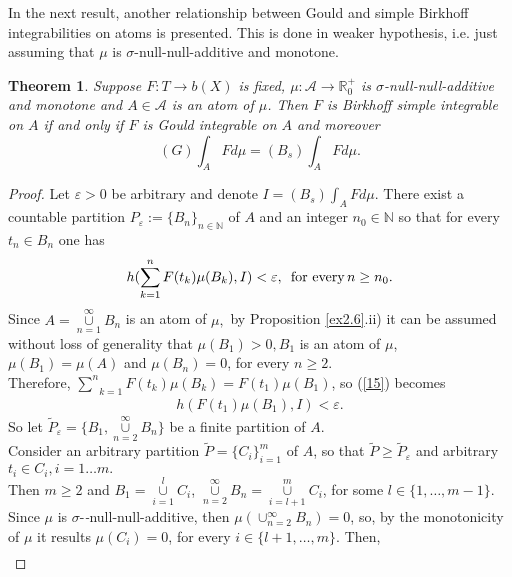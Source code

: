 \documentclass[11pt,a4paper,twoside]{amsart}
\newtheorem{theorem}{Theorem}[section]
\begin{document}
In the next result, another relationship between Gould and simple Birkhoff 
integrabilities on atoms is presented. This is done in weaker hypothesis, i.e. just assuming 
that $\mu $ is $\sigma$-null-null-additive and monotone.
\begin{theorem}\label{ex4.3}
Suppose $F:T\rightarrow b(X)$  is fixed,
$\mu :\mathcal{A}\rightarrow \mathbb{R}^{+}_0$
is $\sigma$-null-null-additive and monotone and $A\in \mathcal{A}$
 is an atom of $\mu $. Then  $F$ is Birkhoff simple
integrable on $A$ if and only if  $F$ is Gould integrable on $A$
 and moreover
$$(G)\int_{A}Fd\mu =(B_s)\int_{A}Fd\mu .$$
\end{theorem}
\begin{proof} Let $\varepsilon >0$ be arbitrary and denote 
$I=(B_s)\int_{A}Fd\mu .$ There exist a countable partition $P_{\varepsilon}:=\{B_{n}\}_{n\in \mathbb{N}}$ of $A$ and 
an integer $n_0\in\mathbb{N}$ 
so that for every $t_{n}\in B_{n}$ 
one has
\begin{eqnarray}\label{15}
h(\sum_{k=1}^n F(t_{k})\mu (B_{k}),I)<\varepsilon , \mbox{\, for every\,} n\geq n_0.
\end{eqnarray}
Since $A=\underset{n=1}{\overset{\infty }{\cup }}B_{n}$ is an atom of $\mu ,$
by Proposition \ref{ex2.6}.ii) it can be assumed
without  loss of generality that 
$\mu (B_{1})>0,B_{1}$ is an atom of $\mu $, $\mu (B_{1})=\mu (A)$ and
$\mu(B_{n})=0$, for every $n\geq 2.$ \\
Therefore, 
$\underset{k=1}{\overset{
n}{\sum }}F(t_{k})\mu (B_{k})=F(t_{1})\mu (B_{1})$, so (\ref{15}) becomes 
\begin{eqnarray}\label{16}
h(F(t_{1})\mu (B_{1}),I) <\varepsilon .
\end{eqnarray}
So let  $\widetilde{P}_{\varepsilon }=\{B_{1},\underset{n=2}
{\overset{
\infty }{\cup }}B_{n}\}$ be a finite partition of $A$.
\\
Consider an arbitrary partition $\widetilde{P}=\{C_{i}\}_{i=1}^m
$ of $A$, so that $\widetilde{P}\geq \widetilde{P}_{\varepsilon }$ and
arbitrary $t_{i}\in C_{i},i=1 \ldots m.$\\
 Then $m\geq 2$ and
 $B_{1}=\underset{i=1}{\overset{l}{\cup }}C_{i}$, $\underset{n=2}{
\overset{\infty }{\cup }}B_{n}=\underset{i=l+1}{\overset{m}{\cup }}C_{i}$,
for some $l\in \{1,\ldots,m-1\}.$
\\
Since $\mu $ is $\sigma$-\textit{-}null-null-additive, then $\mu (\cup_{n=2}^{\infty} B_{n})=0$, so, by the monotonicity of $\mu $
it results $\mu (C_{i})=0$, for every $i\in \{l+1, \ldots, m\}.$ Then, 
\begin{eqnarray}\label{17}

\end{eqnarray}
\end{proof}
\end{document}
